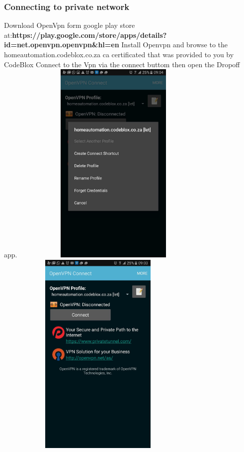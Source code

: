 \documentclass[a4paper,12pt]{article}
\begin{document}
			\subsubsection{Connecting to private network}
			Download OpenVpn form google play store at:\newline \textbf{https://play.google.com/store/apps/details?id=net.openvpn.openvpn\&hl=en} \newline\newline
			Install Openvpn and browse to the homeautomation.codeblox.co.za ca certificated that was provided to you by CodeBlox \newline
			Connect to the Vpn via the connect buttom then open the Dropoff app. \newline\newline
			\includegraphics[width=10cm,height=10cm,keepaspectratio]{./Pictures/open2.jpeg}
			\includegraphics[width=10cm,height=10cm,keepaspectratio]{./Pictures/open1.jpeg}\\ 
			
\end{document}

